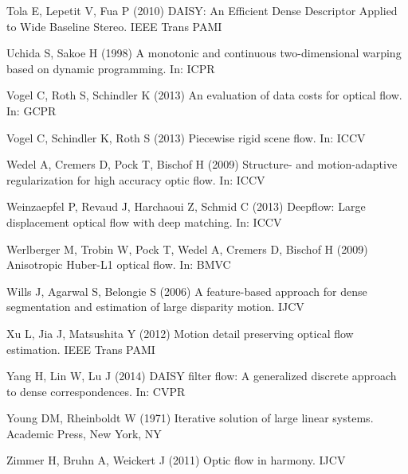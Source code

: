 \documentclass[twocolumn,natbib]{svjour3}
\begin{document}
\begin{thebibliography}{57}
Tola E, Lepetit V, Fua P (2010) {DAISY: An Efficient Dense Descriptor Applied
  to Wide Baseline Stereo}. IEEE Trans PAMI

Uchida S, Sakoe H (1998) A monotonic and continuous two-dimensional warping
  based on dynamic programming. In: ICPR

Vogel C, Roth S, Schindler K (2013{}) An evaluation of data costs
  for optical flow. In: GCPR

Vogel C, Schindler K, Roth S (2013{}) Piecewise rigid scene flow.
  In: ICCV

Wedel A, Cremers D, Pock T, Bischof H (2009) Structure- and motion-adaptive
  regularization for high accuracy optic flow. In: ICCV

Weinzaepfel P, Revaud J, Harchaoui Z, Schmid C (2013) Deepflow: Large
  displacement optical flow with deep matching. In: ICCV

Werlberger M, Trobin W, Pock T, Wedel A, Cremers D, Bischof H (2009)
  Anisotropic {H}uber-{L}1 optical flow. In: BMVC

Wills J, Agarwal S, Belongie S (2006) A feature-based approach for dense
  segmentation and estimation of large disparity motion. IJCV

Xu L, Jia J, Matsushita Y (2012) Motion detail preserving optical flow
  estimation. IEEE Trans PAMI

Yang H, Lin W, Lu J (2014) {DAISY} filter flow: {A} generalized discrete
  approach to dense correspondences. In: {CVPR}

Young DM, Rheinboldt W (1971) {Iterative solution of large linear systems}.
  Academic Press, New York, NY

Zimmer H, Bruhn A, Weickert J (2011) Optic flow in harmony. IJCV

\end{thebibliography}
\end{document}
